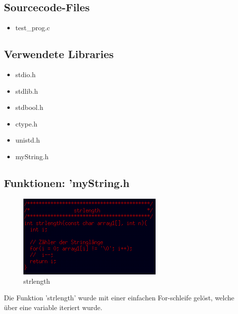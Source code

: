 \documentclass{scrartcl}
\begin{document}
\subsection{Sourcecode-Files}
\begin{itemize}
\item test\_prog.c
\end{itemize}

\subsection{Verwendete Libraries}
\begin{itemize}
\item stdio.h
\item stdlib.h
\item stdbool.h
\item ctype.h
\item unistd.h
\item myString.h
\end{itemize}

\subsection{Funktionen: 'myString.h}
\begin{figure}[H]
  \centering
  \includegraphics[width=0.9\linewidth]{images/strlength.png}
  \caption{strlength}
  \label{fig:digraph}
\end{figure}
Die Funktion 'strlength' wurde mit einer einfachen For-schleife gelöst, welche über eine variable iteriert wurde.
\end{document}

